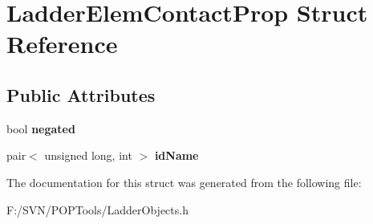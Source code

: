 \hypertarget{struct_ladder_elem_contact_prop}{\section{Ladder\-Elem\-Contact\-Prop Struct Reference}
\label{struct_ladder_elem_contact_prop}
}
\subsection*{Public Attributes}
\begin{DoxyCompactItemize}
\item 
\hypertarget{struct_ladder_elem_contact_prop_a22b751fc26aa82b72a135d2aac4d2599}{bool {\bfseries negated}}\label{struct_ladder_elem_contact_prop_a22b751fc26aa82b72a135d2aac4d2599}

\item 
\hypertarget{struct_ladder_elem_contact_prop_a6e564792cc6d62a2ec1f6657d69060ad}{pair$<$ unsigned long, int $>$ {\bfseries id\-Name}}\label{struct_ladder_elem_contact_prop_a6e564792cc6d62a2ec1f6657d69060ad}

\end{DoxyCompactItemize}


The documentation for this struct was generated from the following file\-:\begin{DoxyCompactItemize}
\item 
F\-:/\-S\-V\-N/\-P\-O\-P\-Tools/Ladder\-Objects.\-h\end{DoxyCompactItemize}
